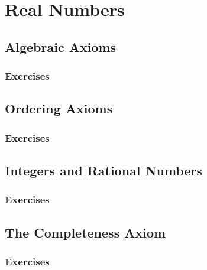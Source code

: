 \setcounter{chapter}{0}
\renewcommand{\thechapter}{1}
\chapter{Real Numbers}\label{ch:1}
\setcounter{equation}{0}	        %

\section{Algebraic Axioms}\label{sec:1.1}
\subsection*{Exercises}\label{sec:1.1_Exercises}
\section{Ordering Axioms}\label{sec:1.2}	
\subsection*{Exercises}\label{sec:1.2_Exercises}
\section{Integers and Rational Numbers}\label{sec:1.3}	
\subsection*{Exercises}\label{sec:1.3_Exercises}
\section{The Completeness Axiom}\label{sec:1.4}	
\subsection*{Exercises}\label{sec:1.4_Exercises}
